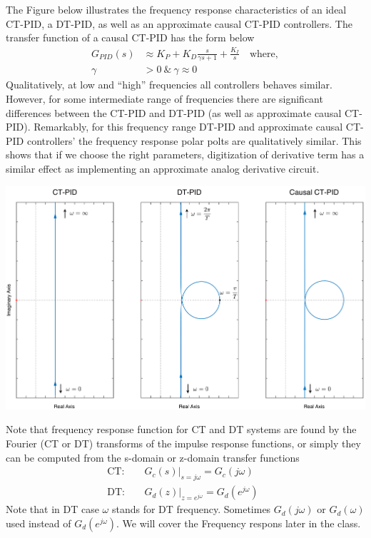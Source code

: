 \documentclass[twoside]{article}
\begin{document}
%
The Figure below illustrates the frequency response characteristics of
an ideal CT-PID, a DT-PID, as well as an approximate causal CT-PID 
controllers. The transfer function of a causal CT-PID has the form
below
%
\begin{align*}
   G_{PID}(s) &\approx K_P + K_D \frac{s}{\gamma s + 1} +
                \frac{K_I}{s} \quad \mathrm{where ,}
                \\
     \gamma &> 0 \ \& \ \gamma \approx 0
\end{align*}
%
Qualitatively, at low and ``high'' frequencies all controllers behaves
similar. However, for some intermediate range of  frequencies there are significant
differences between the CT-PID and DT-PID (as well as approximate
causal CT-PID). Remarkably, for this frequency range DT-PID and approximate causal
CT-PID controllers' the frequency response polar polts are
qualitatively similar. This shows that if we choose the right
parameters, digitization of derivative term has a similar effect as
implementing an approximate analog derivative circuit. 
%
    \begin{center}
\begin{minipage}[h]{0.9\linewidth}
    \begin{center}
      \includegraphics[width=\textwidth]{PID_Comp}
    \end{center}
\end{minipage}
    \end{center}
%

Note that frequency response function for CT and DT systems 
are found by the Fourier (CT or DT) transforms of the impulse
response functions, or simply they can be computed from
the s-domain or z-domain transfer functions
%
\begin{align*}
  \mathrm{CT:}& \quad G_c(s)|_{s = j\omega} = G_c(j \omega) \quad \\
  \mathrm{DT:}& \quad G_d(z)|_{z = e^{j\omega}} = G_d(e^{j\omega}) 
\end{align*}
%
Note that in DT case $\omega$ stands for DT frequency. Sometimes
$G_d(j\omega)$ or $G_d(\omega)$ used instead of $G_d(e^{j\omega})$.
We will cover the Frequency respons later in the class. 
\end{document}
